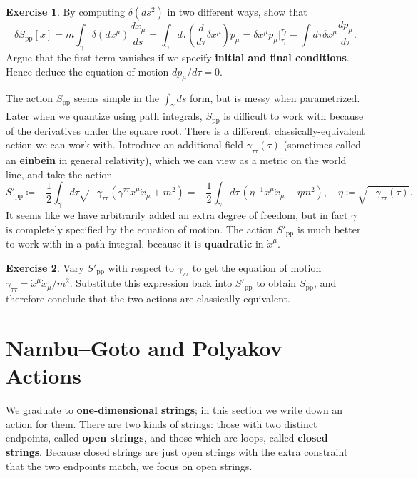\documentclass{report}
\theoremstyle{plain}
\theoremstyle{definition}
\newtheorem{exercise}{Exercise}[section]
\theoremstyle{remark}
\newcommand{\pp}{\text{pp}}
\newcommand{\dder}[2]{\frac{d #1}{d #2}}
\begin{document}
\begin{exercise}
  By computing $\delta(ds^2)$ in two different ways, show that
  \[ \delta S_{\pp}[x] = m\int_\gamma \delta(dx^\mu) \frac{dx_\mu}{ds} = \int_\gamma d\tau \left(\dder{}{\tau} \delta x^\mu\right) p_\mu = \delta x^\mu p_\mu\bigg|_{\tau_i}^{\tau_f} - \int d\tau \delta x^\mu \dder{p_\mu}{\tau}. \]
  Argue that the first term vanishes if we specify {\bf initial and
    final conditions}. Hence deduce the equation of motion
  $dp_\mu/d\tau = 0$.
\end{exercise}

The action $S_{\pp}$ seems simple in the $\int_\gamma ds$ form, but is
messy when parametrized. Later when we quantize using path integrals,
$S_{\pp}$ is difficult to work with because of the derivatives under
the square root. There is a different, classically-equivalent action
we can work with. Introduce an additional field
$\gamma_{\tau\tau}(\tau)$ (sometimes called an {\bf einbein} in
general relativity), which we can view as a metric on the world line,
and take the action
\[ S'_{\pp} \coloneqq -\frac{1}{2} \int_\gamma d\tau \sqrt{-\gamma_{\tau\tau}} (\gamma^{\tau\tau} \dot{x}^\mu \dot{x}_\mu + m^2) = -\frac{1}{2} \int_\gamma d\tau \, (\eta^{-1} \dot{x}^\mu \dot{x}_\mu - \eta m^2), \quad \eta \coloneqq \sqrt{-\gamma_{\tau\tau}(\tau)}. \]
It seems like we have arbitrarily added an extra degree of freedom,
but in fact $\gamma$ is completely specified by the equation of
motion. The action $S'_{\pp}$ is much better to work with in a path
integral, because it is {\bf quadratic} in $\dot{x}^\mu$.

\begin{exercise}
  Vary $S'_{\pp}$ with respect to $\gamma_{\tau\tau}$ to get the
  equation of motion $\gamma_{\tau\tau} = \dot{x}^\mu
  \dot{x}_\mu/m^2$. Substitute this expression back into $S'_{\pp}$ to
  obtain $S_{\pp}$, and therefore conclude that the two actions are
  classically equivalent.
\end{exercise}

\section{Nambu--Goto and Polyakov Actions}

We graduate to {\bf one-dimensional strings}; in this section we write
down an action for them. There are two kinds of strings: those with
two distinct endpoints, called {\bf open strings}, and those which are
loops, called {\bf closed strings}. Because closed strings are just
open strings with the extra constraint that the two endpoints match,
we focus on open strings.
\end{document}
